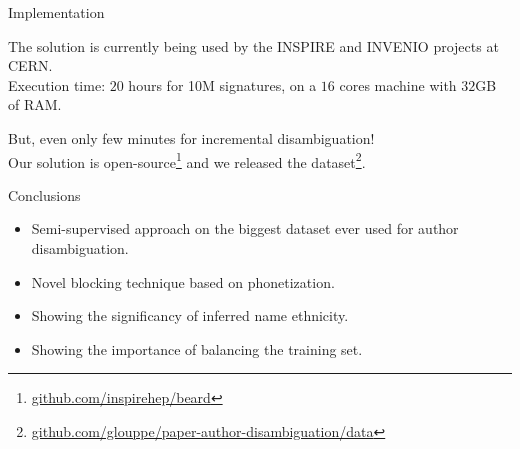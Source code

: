 \documentclass{beamer}
\begin{document}

\begin{frame}{Implementation}

The solution is currently being used by the INSPIRE and INVENIO projects at CERN. \\[1em]


Execution time: $20$ hours for 10M signatures, on a $16$ cores machine with $32$GB of RAM. 

{\color{red} But}, even only few minutes for incremental disambiguation! \\[1em]




Our solution is open-source\footnote{\url{github.com/inspirehep/beard}} and we released the
dataset\footnote{\url{github.com/glouppe/paper-author-disambiguation/data}}.


\end{frame}

\begin{frame}{Conclusions}

\begin{itemize}
\item Semi-supervised approach on the biggest dataset ever used for author disambiguation.
\item Novel blocking technique based on phonetization.
\item Showing the significancy of inferred name ethnicity.
\item Showing the importance of balancing the training set.
\end{itemize}

\end{frame}

\end{document}
